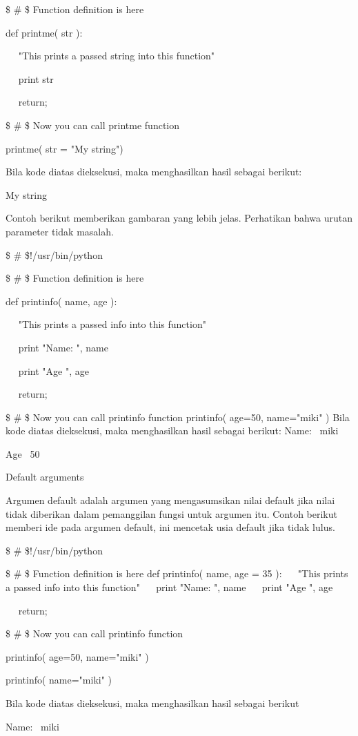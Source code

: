 \$  \#  \$ Function definition is here

 def printme( str ): 

~~ "This prints a passed string into this function" 

~~ print str 

~~ return; 

 \$  \#  \$ Now you can call printme function 

printme( str = "My string") 

Bila kode diatas dieksekusi, maka menghasilkan hasil sebagai berikut:

My string 

Contoh berikut memberikan gambaran yang lebih jelas. Perhatikan bahwa urutan parameter tidak masalah. 

\$  \#  \$!/usr/bin/python 

\$  \#  \$ Function definition is here 

def printinfo( name, age ):

~~ "This prints a passed info into this function"

~~ print "Name: ", name 

~~ print "Age ", age 

~~ return; 


\$  \#  \$ Now you can call printinfo function 
printinfo( age=50, name="miki" )
Bila kode diatas dieksekusi, maka menghasilkan hasil sebagai berikut:
Name:~ miki

Age~ 50 


Default arguments 

Argumen default adalah argumen yang mengasumsikan nilai default jika nilai tidak diberikan dalam pemanggilan fungsi untuk argumen itu. Contoh berikut memberi ide pada argumen default, ini mencetak usia default jika tidak lulus.

\$  \#  \$!/usr/bin/python

\$  \#  \$ Function definition is here 
def printinfo( name, age = 35 ): 
~~ "This prints a passed info into this function"
~~ print "Name: ", name 
~~ print "Age ", age 

~~ return;

\$  \#  \$ Now you can call printinfo function

printinfo( age=50, name="miki" ) 

printinfo( name="miki" ) 

Bila kode diatas dieksekusi, maka menghasilkan hasil sebagai berikut

Name:~ miki 

